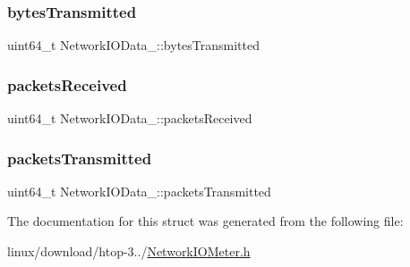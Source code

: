 \subsubsection{\texorpdfstring{bytes\+Transmitted}{bytesTransmitted}}
{\footnotesize\ttfamily uint64\+\_\+t Network\+I\+O\+Data\+\_\+\+::bytes\+Transmitted}

\mbox{\label{structNetworkIOData___ade14b698d116cf9e9f86dce3f40b6bfc}} 
\subsubsection{\texorpdfstring{packets\+Received}{packetsReceived}}
{\footnotesize\ttfamily uint64\+\_\+t Network\+I\+O\+Data\+\_\+\+::packets\+Received}

\mbox{\label{structNetworkIOData___aeaf36b99dcef5149d0afa559201fe6ad}} 
\subsubsection{\texorpdfstring{packets\+Transmitted}{packetsTransmitted}}
{\footnotesize\ttfamily uint64\+\_\+t Network\+I\+O\+Data\+\_\+\+::packets\+Transmitted}



The documentation for this struct was generated from the following file\+:\begin{DoxyCompactItemize}
\item 
linux/download/htop-\/3../\hyperlink{NetworkIOMeter_8h}{Network\+I\+O\+Meter.\+h}\end{DoxyCompactItemize}
